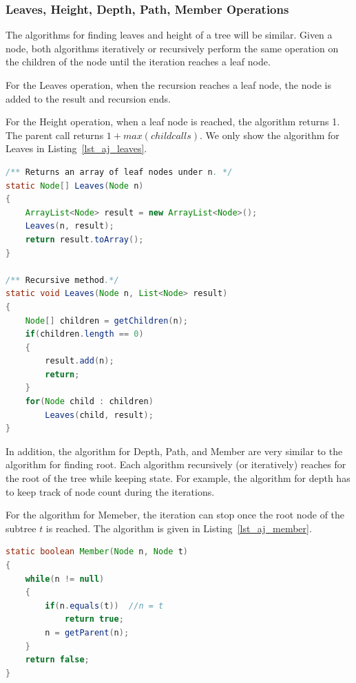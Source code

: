 \subsubsection{Leaves, Height, Depth, Path, Member Operations}

The algorithms for finding leaves and height of a tree will be similar. Given a node, both algorithms iteratively or recursively perform the same operation on the children of the node until the iteration reaches a leaf node.

For the Leaves operation, when the recursion reaches a leaf node, the node is added to the result and recursion ends.

For the Height operation, when a leaf node is reached, the algorithm returns 1. The parent call returns $1 + max(child calls)$. We only show the algorithm for Leaves in Listing~\ref{lst_aj_leaves}.

\begin{lstlisting}[language=java, style=java, caption=Leaves, label=lst_aj_leaves]
/** Returns an array of leaf nodes under n. */
static Node[] Leaves(Node n)
{
    ArrayList<Node> result = new ArrayList<Node>();
    Leaves(n, result);
    return result.toArray();
}

/** Recursive method.*/
static void Leaves(Node n, List<Node> result)
{
    Node[] children = getChildren(n);
    if(children.length == 0)
    {
        result.add(n);
        return;
    }
    for(Node child : children)
        Leaves(child, result);
}

\end{lstlisting}

In addition, the algorithm for Depth, Path, and Member are very similar to the algorithm for finding root. Each algorithm recursively (or iteratively) reaches for the root of the tree while keeping state. For example, the algorithm for depth has to keep track of node count during the iterations.

For the algorithm for Memeber, the iteration can stop once the root node of the subtree $t$ is reached. The algorithm is given in Listing~\ref{lst_aj_member}.

\begin{lstlisting}[language=java, style=java, caption=Member, label=lst_aj_member]
static boolean Member(Node n, Node t)
{
    while(n != null)
    {
        if(n.equals(t))  //n = t
            return true;
        n = getParent(n);
    }
    return false;
}

\end{lstlisting}

